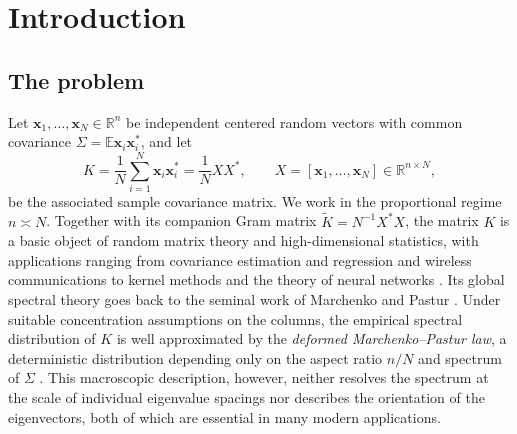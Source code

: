 \documentclass[11pt,reqno]{amsart}
\def\R{\mathbb{R}}
\def\x{\mathbf{x}}
\def\E{\mathbb{E}}
\theoremstyle{definition}
\numberwithin{equation}{section}
\numberwithin{figure}{section}
\begin{document}
\maketitle

\setcounter{tocdepth}{1}
\tableofcontents

\clearpage


\section{Introduction}


\subsection{The problem}

Let $\x_1,\ldots,\x_N\in\R^n$ be independent centered random vectors with common covariance $\Sigma=\E\x_i\x_i^*$, and let
\begin{equation}\label{eq:Kdef}
 K=\frac1N\sum_{i=1}^N\x_i\x_i^*
   =\frac1N X X^*,\qquad X=[\x_1,\ldots,\x_N]\in \R^{n \times N},
\end{equation}
be the associated sample covariance matrix. We work in the proportional regime $n\asymp N$. Together with its companion Gram matrix $\widetilde K=N^{-1}X^*X$, the matrix $K$ is a basic object of random matrix theory and high-dimensional statistics, with applications ranging from covariance estimation and regression \cite{bai2010spectral,dobriban2018high,hastie2022surprises} and wireless communications \cite{tulino2004random,couillet2011random} to kernel methods and the theory of neural networks \cite{el2010spectrum,cheng2013spectrum,pennington2017nonlinear,louart2018random,jacot2018neural,mei2022generalization,couillet2022random}. Its global spectral theory goes back to the seminal work of Marchenko and Pastur \cite{marvcenko1967distribution}. Under suitable concentration assumptions on the columns, the empirical spectral distribution of $K$ is well approximated by the \emph{deformed Marchenko--Pastur law}, a deterministic distribution depending only on the aspect ratio $n/N$ and spectrum of $\Sigma$ \cite{silverstein1995empirical,silverstein1995strong}. This macroscopic description, however, neither resolves the spectrum at the scale of individual eigenvalue spacings nor describes the orientation of the eigenvectors, both of which are essential in many modern applications.
\end{document}
